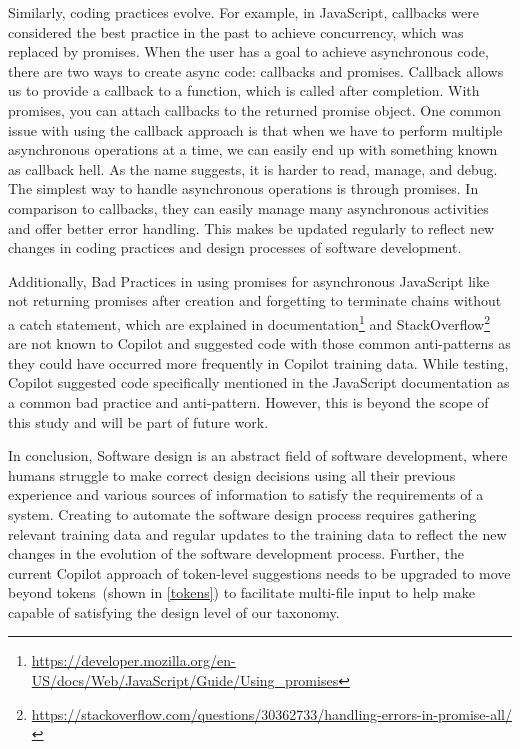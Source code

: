 Similarly, coding practices evolve. 
For example, in JavaScript, callbacks were considered the best practice in the past to achieve concurrency, which was replaced by promises. 
When the user has a goal to achieve asynchronous code, there are two ways to create async code: callbacks and promises. Callback allows us to provide a callback to a function, which is called after completion. With promises, you can attach callbacks to the returned promise object.
One common issue with using the callback approach is that when we have to perform multiple asynchronous operations at a time, we can easily end up with something known as callback hell.
As the name suggests, it is harder to read, manage, and debug. The simplest way to handle asynchronous operations is through promises. In comparison to callbacks, they can easily manage many asynchronous activities and offer better error handling.
This makes \cct{} be updated regularly to reflect new changes in coding practices and design processes of software development. 

Additionally, Bad Practices in using promises for asynchronous JavaScript like not returning promises after creation and forgetting to terminate chains without a catch statement, which are explained in documentation\footnote{\label{docs}\url{https://developer.mozilla.org/en-US/docs/Web/JavaScript/Guide/Using_promises}} and StackOverflow\footnote{\url{https://stackoverflow.com/questions/30362733/handling-errors-in-promise-all/}} are not known to Copilot and suggested code with those common anti-patterns as they could have occurred more frequently in Copilot training data. 
While testing, Copilot suggested code specifically mentioned in the JavaScript documentation as a common bad practice and anti-pattern.
However, this is beyond the scope of this study and will be part of future work.

In conclusion, Software design is an abstract field of software development, where humans struggle to make correct design decisions using all their previous experience and various sources of information to satisfy the requirements of a system. 
Creating \cct{} to automate the software design process requires gathering relevant training data and regular updates to the training data to reflect the new changes in the evolution of the software development process. Further, the current Copilot approach of token-level suggestions needs to be upgraded to move beyond tokens~(shown in \ref{tokens}) to facilitate multi-file input to help make \cct{} capable of satisfying the design level of our taxonomy.